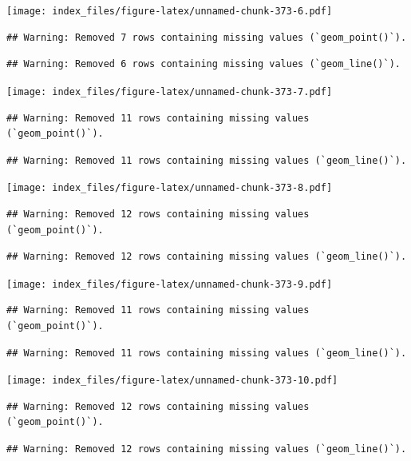 \documentclass[
]{article}
\begin{document}
\texttt{[image: index\_files/figure-latex/unnamed-chunk-373-6.pdf]}

\begin{verbatim}
## Warning: Removed 7 rows containing missing values (`geom_point()`).
\end{verbatim}

\begin{verbatim}
## Warning: Removed 6 rows containing missing values (`geom_line()`).
\end{verbatim}

\texttt{[image: index\_files/figure-latex/unnamed-chunk-373-7.pdf]}

\begin{verbatim}
## Warning: Removed 11 rows containing missing values (`geom_point()`).
\end{verbatim}

\begin{verbatim}
## Warning: Removed 11 rows containing missing values (`geom_line()`).
\end{verbatim}

\texttt{[image: index\_files/figure-latex/unnamed-chunk-373-8.pdf]}

\begin{verbatim}
## Warning: Removed 12 rows containing missing values (`geom_point()`).
\end{verbatim}

\begin{verbatim}
## Warning: Removed 12 rows containing missing values (`geom_line()`).
\end{verbatim}

\texttt{[image: index\_files/figure-latex/unnamed-chunk-373-9.pdf]}

\begin{verbatim}
## Warning: Removed 11 rows containing missing values (`geom_point()`).
\end{verbatim}

\begin{verbatim}
## Warning: Removed 11 rows containing missing values (`geom_line()`).
\end{verbatim}

\texttt{[image: index\_files/figure-latex/unnamed-chunk-373-10.pdf]}

\begin{verbatim}
## Warning: Removed 12 rows containing missing values (`geom_point()`).
\end{verbatim}

\begin{verbatim}
## Warning: Removed 12 rows containing missing values (`geom_line()`).
\end{verbatim}
\end{document}
